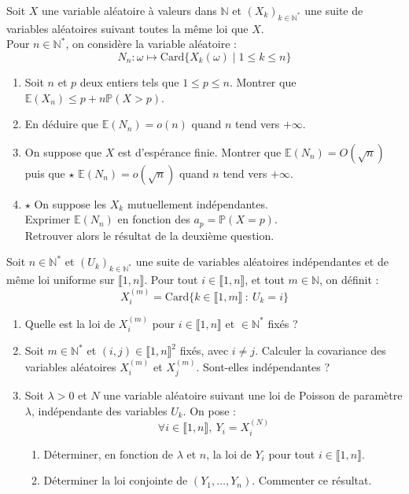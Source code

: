 \documentclass[french,a4paper]{article}
\renewcommand{\P}{\mathbb{P}}
\newcommand{\N}{\mathbb{N}}
\newcommand{\st}{^*}
\newcommand{\E}{\mathbb{E}}
\newcommand{\card}{\text{Card}}
\theoremstyle{plain}
\theoremstyle{definition}
\theoremstyle{remark}
\begin{document}
\begin{ex}[Moulin.55]{}
	Soit $X$ une variable aléatoire à valeurs dans $\N$ et $(X_k)_{k\in\N\st}$ une suite de variables aléatoires suivant toutes la même loi que $X$. \\ Pour $n\in\N\st$, on considère la variable aléatoire : $$N_n:\omega\mapsto\card\{X_k(\omega)\mid 1\leqslant k\leqslant n\}$$
	\begin{enumerate}
		\item Soit $n$ et $p$ deux entiers tels que $1\leqslant p\leqslant n$. Montrer que $\E(X_n)\leqslant p+n\P(X>p)$.
		\item En déduire que $\E(N_n)=o(n)$ quand $n$ tend vers $+\infty$.
		\item On suppose que $X$ est d'espérance finie. Montrer que $\E(N_n)=O(\sqrt{n})$ puis que $\star$ $\E(N_n)=o(\sqrt{n})$ quand $n$ tend vers $+\infty$.
		\item $\star$ On suppose les $X_k$ mutuellement indépendantes. \\
		Exprimer $\E(N_n)$ en fonction des $a_p=\P(X=p)$. \\
		Retrouver alors le résultat de la deuxième question.
	\end{enumerate}
\end{ex}

\begin{ex}[Moulin.56]{}
	Soit $n\in\N\st$ et $(U_k)_{k\in\N\st}$ une suite de variables aléatoires indépendantes et de même loi uniforme sur $\llbracket1,n\rrbracket$. Pour tout $i\in\llbracket1,n\rrbracket$, et tout $m\in\N$, on définit : $$X_i^{(m)}=\card\{k\in\llbracket1,m\rrbracket\ : \ U_k=i\}$$
	\begin{enumerate}
		\item Quelle est la loi de $X_i^{(m)}$ pour $i\in\llbracket1,n\rrbracket$ et $\in\N\st$ fixés ?
		\item Soit $m\in\N\st$ et $(i,j)\in\llbracket1,n\rrbracket^2$ fixés, avec $i\ne j$. Calculer la covariance des variables aléatoires $X_i^{(m)}$ et $X_j^{(m)}$. Sont-elles indépendantes ?
		\item Soit $\lambda>0$ et $N$ une variable aléatoire suivant une loi de Poisson de paramètre $\lambda$, indépendante des variables $U_k$. On pose : $$\forall i\in\llbracket1,n\rrbracket,\ Y_i=X_i^{(N)}$$
		\begin{enumerate}[label=\alph*.]
			\item Déterminer, en fonction de $\lambda$ et $n$, la loi de $Y_i$ pour tout $i\in\llbracket1,n\rrbracket$.
			\item Déterminer la loi conjointe de $(Y_1,\ldots,Y_n)$. Commenter ce résultat.
		\end{enumerate}
	\end{enumerate}
\end{ex}
\end{document}
